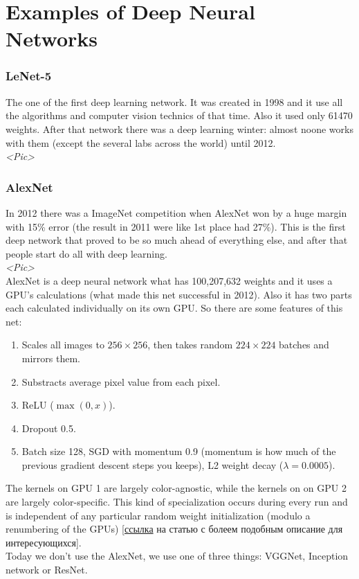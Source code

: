 \section{Examples of Deep Neural Networks}
\vspace{-0.6cm}
\subsubsection*{LeNet-5}

The one of the first deep learning network. It was created in 1998 and it use all the algorithms and computer vision technics of that time. Also it used only 61470 weights. After that network there was a deep learning winter: almost noone works with them (except the several labs across the world) until 2012.\\
{\it <Pic>}

\subsubsection*{AlexNet}

In 2012 there was a ImageNet competition when AlexNet won by a huge margin with 15\% error (the result in 2011 were like 1st place had 27\%). This is the first deep network that proved to be so much ahead of everything else, and after that people start do all with deep learning.\\
{\it <Pic>}\\
AlexNet is a deep neural network what has 100,207,632 weights and it uses a GPU's calculations (what made this net successful in 2012). Also it has two parts each calculated individually on its own GPU. So there are some features of this net:
\begin{enumerate}[label=$\bullet$]
  \item Scales all images to $256\times256$, then takes random $224\times224$ batches and mirrors them.
  \item Substracts average pixel value from each pixel.
  \item ReLU ($\max(0,x)$).
  \item Dropout 0.5.
  \item Batch size 128, SGD with momentum 0.9 (momentum is how much of the previous gradient descent steps you keeps), L2 weight decay ($\lambda=0.0005$).
\end{enumerate}
The kernels on GPU 1 are largely color-agnostic, while the kernels on on GPU 2 are largely color-specific. This kind of specialization occurs during every run and is independent of any particular random weight initialization (modulo a renumbering of the GPUs) [\href{https://www.nvidia.cn/content/tesla/pdf/machine-learning/imagenet-classification-with-deep-convolutional-nn.pdf}{ссылка} на статью с болеем подобным описание для интересующихся].\\
Today we don't use the AlexNet, we use one of three things: VGGNet, Inception network or ResNet.

